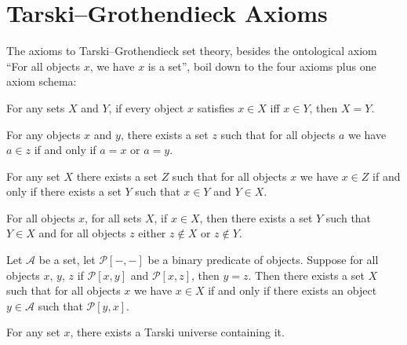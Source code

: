 \section{Tarski--Grothendieck Axioms}

\begin{node}[Axioms]\label{tg-0003}%
The axioms to Tarski--Grothendieck set theory, besides the ontological
axiom ``For all objects $x$, we have $x$ is a set'', boil down to the
four axioms plus one axiom schema:

\begin{node}\label{tg-0004}%
For any sets $X$ and $Y$, if every object $x$ satisfies $x\in X$ iff
$x\in Y$, then $X=Y$.
\end{node}

\begin{node}\label{tg-0005}%
For any objects $x$ and $y$, there exists a set $z$ such that for all
objects $a$ we have $a\in z$ if and only if $a=x$ or $a=y$.
\end{node}

\begin{node}\label{tg-0006}%
For any set $X$ there exists a set $Z$ such that for all objects $x$ we
have $x\in Z$ if and only if there exists a set $Y$ such that $x\in Y$
and $Y\in X$.
\end{node}

\begin{node}\label{tg-0007}%
For all objects $x$, for all sets $X$, if $x\in X$, then there exists a
set $Y$ such that $Y\in X$ and for all objects $z$ either $z\notin X$ or
$z\notin Y$.
\end{node}

\begin{node}\label{tg-0008}%
Let $\mathcal{A}$ be a set, let $\mathcal{P}[-,-]$ be a binary predicate
of objects. Suppose for all objects $x$, $y$, $z$ if $\mathcal{P}[x,y]$ and
$\mathcal{P}[x,z]$, then $y=z$.
Then there exists a set $X$ such that for all objects $x$ we have $x\in X$
if and only if there exists an object $y\in\mathcal{A}$ such that $\mathcal{P}[y,x]$.
\end{node}

\begin{node}\label{tg-0009}%
For any set $x$, there exists a Tarski universe containing it.
\end{node}
\end{node}

